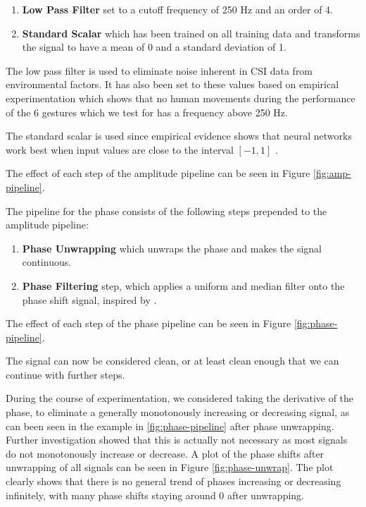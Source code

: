\begin{enumerate}
	\item \textbf{Low Pass Filter} set to a cutoff frequency of 250 Hz and an order of 4.
	\item \textbf{Standard Scalar} which has been trained on all training data and transforms the signal to have a mean of 0 and a standard deviation of 1.
\end{enumerate}

The low pass filter is used to eliminate noise inherent in CSI data from environmental factors.
It has also been set to these values based on empirical experimentation which shows that no human movements during the performance of the 6 gestures which we test for has a frequency above 250 Hz.

The standard scalar is used since empirical evidence shows that neural networks work best when input values are close to the interval $[-1, 1]$ \cite{varun2023tuning}.

The effect of each step of the amplitude pipeline can be seen in Figure \ref{fig:amp-pipeline}.

The pipeline for the phase consists of the following steps prepended to the amplitude pipeline:
\begin{enumerate}
	\item \textbf{Phase Unwrapping} which unwraps the phase and makes the signal continuous.
	\item \textbf{Phase Filtering} step, which applies a uniform and median filter onto the phase shift signal, inspired by \cite{oerlemans2022effect}.
\end{enumerate}

The effect of each step of the phase pipeline can be seen in Figure \ref{fig:phase-pipeline}.

The signal can now be considered clean, or at least clean enough that we can continue with further steps.

During the course of experimentation, we considered taking the derivative of the phase, to eliminate a generally monotonously increasing or decreasing signal, as can been seen in the example in \ref{fig:phase-pipeline} after phase unwrapping.
Further investigation showed that this is actually not necessary as most signals do not monotonously increase or decrease.
A plot of the phase shifts after unwrapping of all signals can be seen in Figure \ref{fig:phase-unwrap}.
The plot clearly shows that there is no general trend of phases increasing or decreasing infinitely, with many phase shifts staying around 0 after unwrapping.

